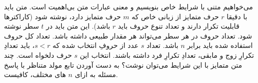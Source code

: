 \p
می‌خواهیم متنی با شرایط خاص بنویسیم و
معنی عبارات متن بی‌اهمیت است.
متن باید با دقیقا
$r$
حرف متمایز از زبانی خاص که
$m$
حرف متمایز دارد،
نوشته شود
(کاراکتر‌ها قابلیت تکرار دارند و تعداد تنوع حروف باید 
$r$
باشد).
این متن باید در 
$t$
سطر نوشته شود. تعداد حروف در هر سطر می‌تواند هر مقدار طبیعی داشته باشد.
تعداد کل حروف استفاده شده باید برابر
$n$
باشد.
تعداد
$s$
عدد از حروفِ انتخاب شده که
$s < r $،
باید تعدادِ تکرارِ زوج و مابقی، تعدادِ تکرارِ فرد داشته باشند.
انتخاب این
$s$
حرف دلخواه است.
چند متن متمایز با این شرایط می‌توان نوشت؟
به دست آوردن تابع مولد متناظر با پاسخ مسئله به ازای $n$ های مختلف، کافیست.